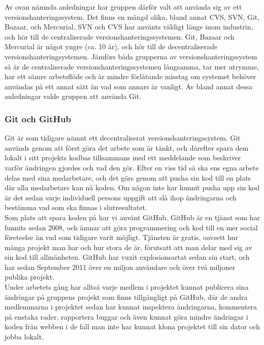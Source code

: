\documentclass[a4paper,11pt]{article}
\begin{document}
Av ovan nämnda anledningar har gruppen därför valt att använda sig av ett versionshanteringssystem. Det finns en mängd olika, bland annat CVS, SVN, Git, Bazaar, och Mercurial. SVN och CVS har använts väldigt länge inom industrin, och hör till de centraliserade versionshanteringssystemen. Git, Bazaar och Mercurial är något yngre (ca. 10 år), och hör till de decentraliserade versionshanteringsystemen. Jämförs båda grupperna av versionshanteringssystem så är de centraliserade versionshanteringssystemen långsamma, tar mer utrymme, har ett sämre arbetsflöde och är mindre förlåtande misstag om systemet behöver användas på ett annat sätt än vad som annars är vanligt. Av bland annat dessa anledningar valde gruppen att använda Git.

\subsubsection{Git och GitHub}
Git är som tidigare nämnt ett decentraliserat versionshanteringssystem. Git används genom att först göra det arbete som är tänkt, och därefter spara dem lokalt i sitt projekts kodbas tillsammans med ett meddelande som beskriver varför ändringen gjordes och vad den gör. Efter en viss tid så ska ens egna arbete delas med sina medarbetare, och det görs genom att pusha sin kod till en plats där alla medarbetare kan nå koden. Om någon inte har hunnit pusha upp sin kod är det sedan varje individuell persons uppgift att slå ihop ändringarna och bestämma vad som ska finnas i slutresultatet. \\

Som plats att spara koden på har vi använt GitHub. GitHub är en tjänst som har funnits sedan 2008, och ämnar att göra programmering och kod till en mer social företeelse än vad som tidigare varit möjligt. Tjänsten är gratis, oavsett hur många projekt man har och hur stora de är, förutsatt att man delar med sig av sin kod till allmänheten. GitHub har vuxit explosionsartat sedan sin start, och har sedan September 2011 över en miljon användare och över två miljoner publika projekt. \\

Under arbetets gång har alltså varje medlem i projektet kunnat publicera sina ändringar på gruppens projekt som finns tillgängligt på GitHub, där de andra medlemmarna i projektet sedan har kunnat inspektera ändringarna, kommentera på enstaka rader, rapportera buggar och även kunnat göra mindre ändringar i koden från webben i de fall man inte har kunnat klona projektet till sin dator och jobba lokalt.
\end{document}
